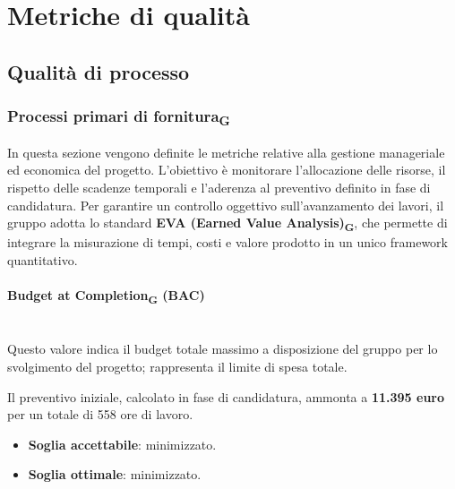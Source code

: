\documentclass[11pt,a4paper]{article}
\newcommand{\gls}[1]{#1\textsubscript{G}}
\begin{document}
\newpage

\section{Metriche di qualità}
\subsection{Qualità di processo}

\subsubsection{\gls{Processi primari di fornitura}}
In questa sezione vengono definite le metriche relative alla gestione manageriale ed economica del progetto. L'obiettivo è monitorare l'allocazione delle risorse, il rispetto delle scadenze temporali e l'aderenza al preventivo definito in fase di candidatura.
Per garantire un controllo oggettivo sull'avanzamento dei lavori, il gruppo adotta lo standard \textbf{EVA (Earned Value Analysis)\textsubscript{G}}, che permette di integrare la misurazione di tempi, costi e valore prodotto in un unico framework quantitativo.

\paragraph{Budget at Completion\textsubscript{G} (BAC)} \hfill \\
Questo valore indica il budget totale massimo a disposizione del gruppo per lo svolgimento del progetto; rappresenta il limite di spesa totale.

Il preventivo iniziale, calcolato in fase di candidatura, ammonta a \textbf{11.395 euro} per un totale di 558 ore di lavoro.
\begin{itemize}
    \item \textbf{Soglia accettabile}: minimizzato.
    \item \textbf{Soglia ottimale}: minimizzato.
\end{itemize}
\end{document}
